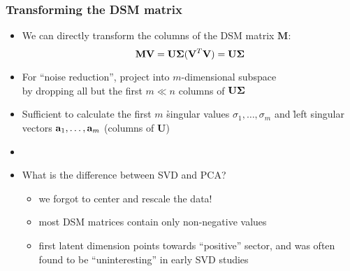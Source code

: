 \begin{frame}
  \frametitle{Transforming the DSM matrix}

  \begin{itemize}
  \item We can directly transform the columns of the DSM matrix $\mathbf{M}$:
    \[
    \mathbf{M} \mathbf{V} 
    = \mathbf{U} \boldsymbol{\Sigma} (\mathbf{V}^T \mathbf{V})
    = \mathbf{U} \boldsymbol{\Sigma}
    \]
    \pause\ungap[1.5]
  \item For ``noise reduction'', project into $m$-dimensional subspace\\
    by dropping all but the first $m \ll n$ columns of $\mathbf{U} \boldsymbol{\Sigma}$
  \item[\So] Sufficient to calculate the first $m$ \h{singular values}
    $\sigma_1,\ldots, \sigma_m$ and \h{left singular vectors} $\va_1,\ldots,
    \va_m$ (columns of $\mathbf{U}$)
  \item[]\pause
  \item What is the difference between SVD and PCA?%
    \pause
    \begin{itemize}
    \item[\hand] we forgot to center and rescale the data!
    \item[\hand] most DSM matrices contain only non-negative values
    \item[\hand] first latent dimension points towards ``positive'' sector,
      and was often found to be ``uninteresting'' in early SVD studies
    \end{itemize}
  \end{itemize}
\end{frame}

